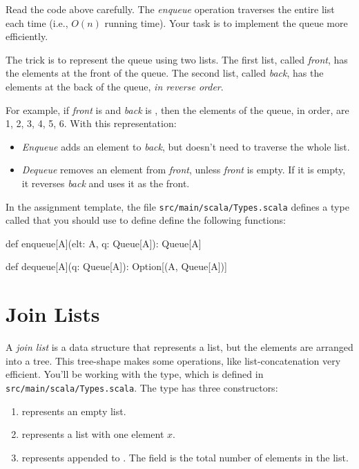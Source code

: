 \documentclass{book}
\begin{document}
Read the code above carefully. The \emph{enqueue} operation traverses the
entire list each time (i.e., $O(n)$ running time). Your task is to implement
the queue more efficiently.

The trick is to represent the queue using two lists. The first list, called
\emph{front}, has the elements at the front of the queue. The second list, called
\emph{back}, has the elements at the back of the queue, \emph{in reverse order}.

For example, if \emph{front} is  and \emph{back} is , then
the elements of the queue, in order, are 1, 2, 3, 4, 5, 6. With this
representation:

\begin{itemize}

\item \emph{Enqueue} adds an element to \emph{back}, but doesn't need to
  traverse the whole list.

\item \emph{Dequeue} removes an element from \emph{front}, unless \emph{front}
  is empty. If it is empty, it reverses \emph{back} and uses it as the front.

\end{itemize}

In the assignment template, the file \texttt{src/main/scala/Types.scala}
defines a type called  that you should use to define
 define the following functions:

\begin{scalacode}
def enqueue[A](elt: A, q: Queue[A]): Queue[A]

def dequeue[A](q: Queue[A]): Option[(A, Queue[A])]
\end{scalacode}

\section{Join Lists}

A \emph{join list} is a data structure that represents a list, but the
elements are arranged into a tree. This tree-shape makes some operations,
like list-concatenation very efficient.
You'll be working with the  type, which is
defined in \texttt{src/main/scala/Types.scala}.
 The type has three constructors:

\begin{enumerate}

\item {} represents an empty list.

\item {} represents a list with one element $x$.

\item {} represents  appended to
       . The  field is the total number of
       elements in the list.

\end{enumerate}
\end{document}
